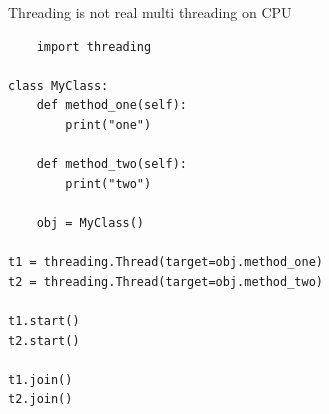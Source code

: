 \documentclass[varwidth,border=10pt]{standalone}
\begin{document}
Threading is not real multi threading on CPU
\begin{verbatim}
    import threading

class MyClass:
    def method_one(self):
        print("one")

    def method_two(self):
        print("two")

    obj = MyClass()
    
t1 = threading.Thread(target=obj.method_one)
t2 = threading.Thread(target=obj.method_two)

t1.start()
t2.start()

t1.join()
t2.join()
\end{verbatim}
\end{document}
